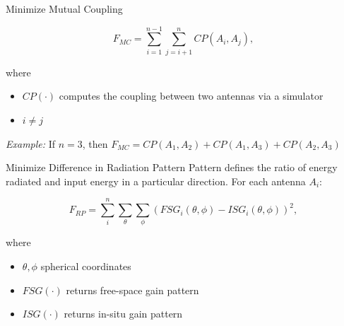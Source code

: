 \documentclass{beamer}
\begin{document}
\begin{frame}{Minimize Mutual Coupling}
    \begin{tcolorbox}[colback=green!5]
        \begin{equation}
            F_{MC} = \sum_{i=1}^{n-1}\sum_{j=i+1}^{n} CP(A_i, A_j),
        \end{equation}
    \end{tcolorbox}
    where
    \begin{itemize}
        \item $CP(\cdot)$ computes the coupling between two antennas via a simulator
        \item $i \neq j$
    \end{itemize}
    \vspace{2mm}
    \small\textit{Example:} If $n=3$, then $F_{MC} = CP(A_1, A_2) + CP(A_1, A_3) + CP(A_2, A_3)$
\end{frame}


\begin{frame}{Minimize Difference in Radiation Pattern}
    Pattern defines the ratio of energy radiated and input energy in a particular direction. For each antenna $A_i$:
    \begin{tcolorbox}[colback=green!5]
        \begin{equation} \label{eq:rp}
            F_{RP} = \sum_i^n\sum_{\theta}\sum_{\phi} 
            \left( FSG_i(\theta,\phi) - ISG_i(\theta,\phi) \right) ^2,
        \end{equation}
    \end{tcolorbox}
    where
    \begin{itemize}
            \small
        \item $\theta, \phi$ spherical coordinates
        \item $FSG(\cdot)$ returns free-space gain pattern  
        \item $ISG(\cdot)$ returns in-situ gain pattern
    \end{itemize}

    \hspace{.6\textwidth}
\end{frame}
\end{document}
